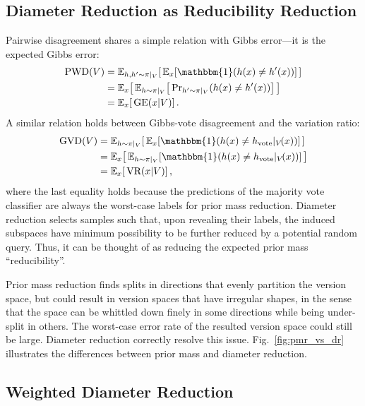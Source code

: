 \documentclass[runningheads, envcountsame, a4paper]{llncs}
\begin{document}
\subsection{Diameter Reduction as Reducibility Reduction}
\label{sec:diameter_reduction_as_reducibility_reduction}
Pairwise disagreement shares a simple relation with Gibbs error---it is the expected Gibbs error:
\begin{align}
\text{PWD}(V)
    &= \mathbb{E}_{h,h^\prime \sim \pi|_V}\! \left[\, \mathbb{E}_x\! \left[ \mathbbm{1}(h(x) \neq h^\prime(x)) \right]\, \right] \\
    &= \mathbb{E}_x\! \left[\, \mathbb{E}_{h \sim \pi|_V}\! \left[\, \textmd{Pr}_{h^\prime \sim \pi|_V}(h(x) \neq h^\prime(x)) \right]\, \right] \\
    &= \mathbb{E}_x\! \left[\, \text{GE}(x|V) \right].
    \label{eq:pw_ge}
\end{align}
A similar relation holds between Gibbs-vote disagreement and the variation ratio:
\begin{align}
\text{GVD}(V) 
    &= \mathbb{E}_{h \sim \pi|_V}\! \left[\, \mathbb{E}_x\! \left[ \mathbbm{1}(h(x) \neq h_{\text{vote}}|_V\! (x)) \right]\, \right] \\
    &= \mathbb{E}_x\! \left[\,  \mathbb{E}_{h \sim \pi|_V}\! \left[ \mathbbm{1}(h(x) \neq h_{\text{vote}}|_V\! (x)) \right]\, \right] \\
    &= \mathbb{E}_x\! \left[\, \text{VR}(x|V) \right],
    \label{eq:gv_vr}
\end{align}
where the last equality holds because the predictions of the majority vote classifier are always the worst-case labels for prior mass reduction. Diameter reduction selects samples such that, upon revealing their labels, the induced subspaces have minimum possibility to be further reduced by a potential random query. Thus, it can be thought of as reducing the expected prior mass ``reducibility''. 

Prior mass reduction finds splits in directions that evenly partition the version space, but could result in version spaces that have irregular shapes, in the sense that the space can be whittled down finely in some directions while being under-split in others. The worst-case error rate of the resulted version space could still be large. Diameter reduction correctly resolve this issue. Fig.~\ref{fig:pmr_vs_dr} illustrates the differences between prior mass and diameter reduction.


\subsection{Weighted Diameter Reduction}
\label{sec:weighted_diameter_reduction}
\end{document}
